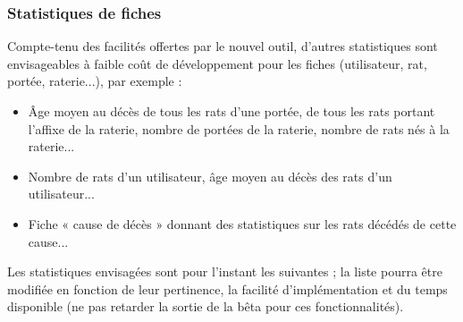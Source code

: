 \documentclass[a4paper,10pt]{article}
\begin{document}
\subsubsection{Statistiques de fiches}

Compte-tenu des facilités offertes par le nouvel outil, d'autres statistiques sont envisageables à faible coût de développement pour les fiches (utilisateur, rat, portée, raterie...), par exemple :
\begin{itemize}
\item Âge moyen au décès de tous les rats d'une portée, de tous les rats portant l'affixe de la raterie, nombre de portées de la raterie, nombre de rats nés à la raterie...
\item Nombre de rats d'un utilisateur, âge moyen au décès des rats d'un utilisateur...
\item Fiche « cause de décès » donnant des statistiques sur les rats décédés de cette cause...  
\end{itemize}

Les statistiques envisagées sont pour l'instant les suivantes ; la liste pourra être modifiée en fonction de leur pertinence, la facilité d'implémentation et du temps disponible (ne pas retarder la sortie de la bêta pour ces fonctionnalités).
\end{document}
